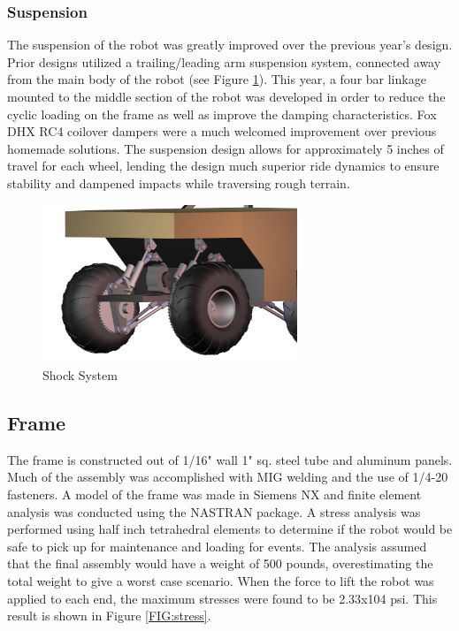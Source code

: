 \subsubsection{Suspension}
The suspension of the robot was greatly improved over the previous year’s design. Prior designs utilized a trailing/leading arm suspension system, connected away from the main body of the robot (see Figure \ref{FIG:Shock}). This year, a four bar linkage mounted to the middle section of the robot was developed in order to reduce the cyclic loading on the frame as well as improve the damping characteristics. Fox DHX RC4 coilover dampers were a much welcomed improvement over previous homemade solutions. The suspension design allows for approximately 5 inches of travel for each wheel, lending the design much superior ride dynamics to ensure stability and dampened impacts while traversing rough terrain.

\begin{figure}[H]
\begin{center}
\includegraphics[width=3in]{./Pics/Suspension-Far.png}
\caption{Shock System}
\label{FIG:Shock}
\end{center}
\end{figure}



\subsection{Frame}
The frame is constructed out of 1/16" wall 1" sq. steel tube and aluminum panels. Much of the assembly was accomplished with MIG welding and the use of 1/4-20 fasteners. A model of the frame was made in Siemens NX and finite element analysis was conducted using the NASTRAN package. A stress analysis was performed using half inch tetrahedral elements to determine if the robot would be safe to pick up for maintenance and loading for events. The analysis assumed that the final assembly would have a weight of 500 pounds, overestimating the total weight to give a worst case scenario. When the force to lift the robot was applied to each end, the maximum stresses were found to be 2.33x104 psi. This result is shown in Figure \ref{FIG:stress}.


